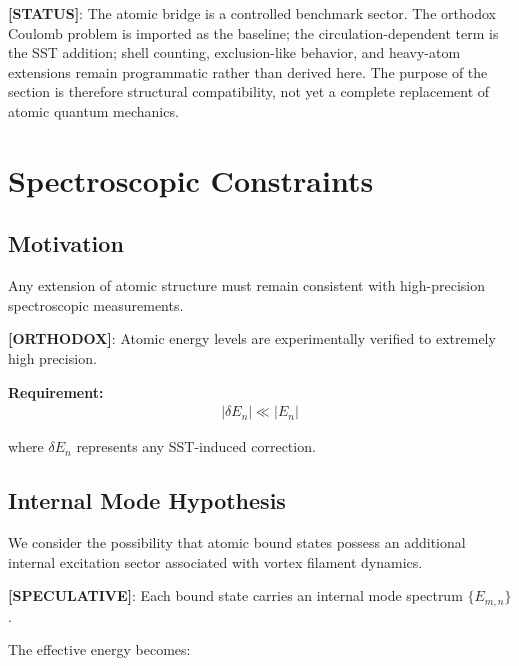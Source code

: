 \documentclass[11pt]{article}
\theoremstyle{definition}
\theoremstyle{plain}
\theoremstyle{remark}
\begin{document}
        \textbf{[STATUS]}: The atomic bridge is a controlled benchmark sector. The orthodox Coulomb problem is imported as the baseline; the circulation-dependent term is the SST addition; shell counting, exclusion-like behavior, and heavy-atom extensions remain programmatic rather than derived here. The purpose of the section is therefore structural compatibility, not yet a complete replacement of atomic quantum mechanics.

        
\section{Spectroscopic Constraints}
    \label{sec:spectroscopy}
    
    \subsection{Motivation}
        
        Any extension of atomic structure must remain consistent with high-precision spectroscopic measurements.
        
        \textbf{[ORTHODOX]}:
        Atomic energy levels are experimentally verified to extremely high precision.
        
        \textbf{Requirement:}
        \begin{align}
            |\delta E_n| \ll |E_n|
            \label{eq:spectro_constraint}
        \end{align}
        
        where $\delta E_n$ represents any SST-induced correction.
    
    \subsection{Internal Mode Hypothesis}
        
        We consider the possibility that atomic bound states possess an additional internal excitation sector associated with vortex filament dynamics.
        
        \textbf{[SPECULATIVE]}:
        Each bound state carries an internal mode spectrum $\{E_{m,n}\}$.
        
        The effective energy becomes:
        
\end{document}
